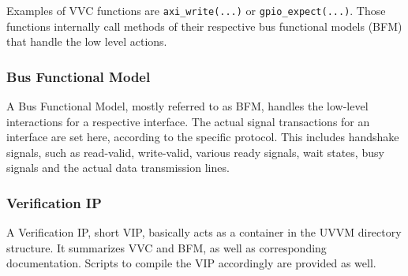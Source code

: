 Examples of VVC functions are \texttt{axi\_write(...)} or \texttt{gpio\_expect(...)}. Those functions internally call methods of their respective bus functional models (BFM) that handle the low level actions.

\subsubsection{Bus Functional Model}

A Bus Functional Model, mostly referred to as BFM, handles the low-level interactions for a respective interface. The actual signal transactions for an interface are set here, according to the specific protocol. This includes handshake signals, such as read-valid, write-valid, various ready signals, wait states, busy signals and the actual data transmission lines.

\subsubsection{Verification IP}

A Verification IP, short VIP, basically acts as a container in the UVVM directory structure. It summarizes VVC and BFM, as well as corresponding documentation. Scripts to compile the VIP accordingly are provided as well.



\newpage
